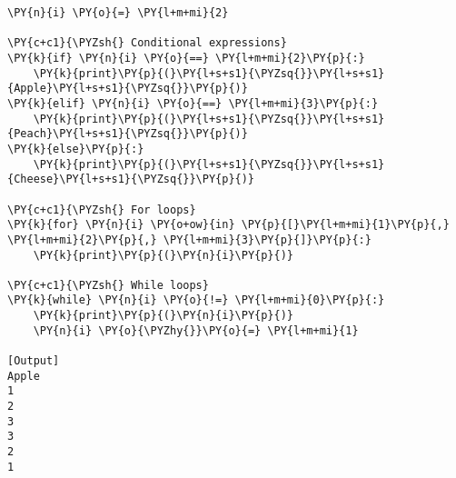 \begin{Verbatim}[label=\makebox{\url{https://bitbucket.org/lbaldini/programming/src/tip/snippets/control\_flow.py}},commandchars=\\\{\}]
\PY{n}{i} \PY{o}{=} \PY{l+m+mi}{2}

\PY{c+c1}{\PYZsh{} Conditional expressions}
\PY{k}{if} \PY{n}{i} \PY{o}{==} \PY{l+m+mi}{2}\PY{p}{:}
    \PY{k}{print}\PY{p}{(}\PY{l+s+s1}{\PYZsq{}}\PY{l+s+s1}{Apple}\PY{l+s+s1}{\PYZsq{}}\PY{p}{)}
\PY{k}{elif} \PY{n}{i} \PY{o}{==} \PY{l+m+mi}{3}\PY{p}{:}
    \PY{k}{print}\PY{p}{(}\PY{l+s+s1}{\PYZsq{}}\PY{l+s+s1}{Peach}\PY{l+s+s1}{\PYZsq{}}\PY{p}{)}
\PY{k}{else}\PY{p}{:}
    \PY{k}{print}\PY{p}{(}\PY{l+s+s1}{\PYZsq{}}\PY{l+s+s1}{Cheese}\PY{l+s+s1}{\PYZsq{}}\PY{p}{)}

\PY{c+c1}{\PYZsh{} For loops}
\PY{k}{for} \PY{n}{i} \PY{o+ow}{in} \PY{p}{[}\PY{l+m+mi}{1}\PY{p}{,} \PY{l+m+mi}{2}\PY{p}{,} \PY{l+m+mi}{3}\PY{p}{]}\PY{p}{:}
    \PY{k}{print}\PY{p}{(}\PY{n}{i}\PY{p}{)}

\PY{c+c1}{\PYZsh{} While loops}
\PY{k}{while} \PY{n}{i} \PY{o}{!=} \PY{l+m+mi}{0}\PY{p}{:}
    \PY{k}{print}\PY{p}{(}\PY{n}{i}\PY{p}{)}
    \PY{n}{i} \PY{o}{\PYZhy{}}\PY{o}{=} \PY{l+m+mi}{1}

[Output]
Apple
1
2
3
3
2
1
\end{Verbatim}